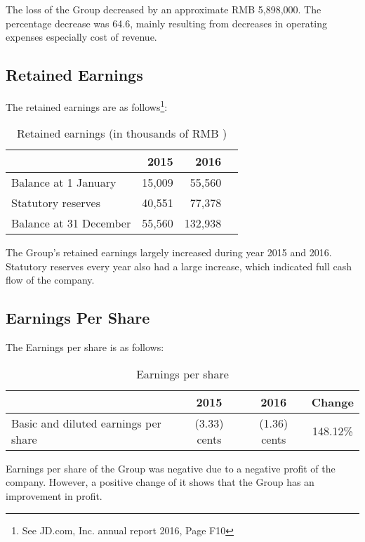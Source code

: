 The loss of the Group decreased by an approximate RMB 5,898,000. The percentage  decrease was 64.6, mainly resulting from decreases in operating expenses especially cost of revenue.

\subsection{Retained Earnings }

The retained earnings are as follows\footnote{See JD.com, Inc. annual report 2016, Page F10}:

\begin{table}[H]	
	\begin{center}
		\begin{tabular}{lrrr}
			\toprule
			&\textbf{2015}&\textbf{2016}\\
			\midrule
			Balance at 1 January&	15,009&	55,560\\
			Statutory reserves&	40,551&	77,378\\
			Balance at 31 December&	55,560&	132,938\\
			\bottomrule
		\end{tabular}
	\end{center}
	\caption{Retained earnings (in thousands of RMB \textyen)}\label{table:1}
\end{table}

The Group’s retained earnings largely increased during year 2015 and 2016. Statutory reserves every year also had a large increase, which indicated full cash flow of the company.

\subsection{Earnings Per Share}
	The Earnings per share is as follows:
\begin{table}[H]	
	\begin{center}
		\begin{tabular}{lccc}
			\toprule
			&\textbf{2015}&\textbf{2016}&\textbf{Change}\\
			\midrule
			Basic and diluted earnings per share&(3.33) cents&(1.36) cents&148.12\%\\
			\bottomrule
		\end{tabular}
	\end{center}
	\caption{Earnings per share}\label{table:1}
\end{table}

Earnings per share of the Group was negative due to a negative profit of the company. However, a positive change of it shows that the Group has an improvement in profit.

